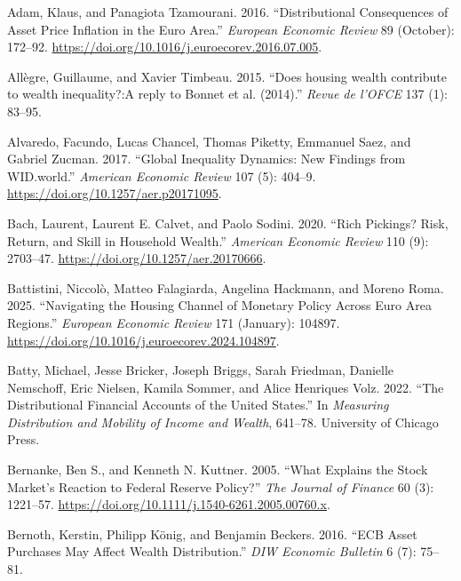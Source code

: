 \documentclass[
  a4paper,
  DIV=11,
  numbers=noendperiod]{scrartcl}
\newlength{\cslhangindent}
\newenvironment{CSLReferences}[2] %
 {\begin{list}{}{%
  \setlength{\itemindent}{0pt}
  \setlength{\leftmargin}{0pt}
  \setlength{\parsep}{0pt}
  \ifodd #1
   \setlength{\leftmargin}{\cslhangindent}
   \setlength{\itemindent}{-1\cslhangindent}
  \fi
  \setlength{\itemsep}{#2\baselineskip}}}
 {\end{list}}
\begin{document}
\label{refs}
\begin{CSLReferences}{1}{0}
Adam, Klaus, and Panagiota Tzamourani. 2016. {``Distributional
Consequences of Asset Price Inflation in the {Euro Area}.''}
\emph{European Economic Review} 89 (October): 172--92.
\url{https://doi.org/10.1016/j.euroecorev.2016.07.005}.

Allègre, Guillaume, and Xavier Timbeau. 2015. {``{Does housing wealth
contribute to wealth inequality?:A reply to Bonnet et al. (2014)}.''}
\emph{Revue de l'OFCE} 137 (1): 83--95.

Alvaredo, Facundo, Lucas Chancel, Thomas Piketty, Emmanuel Saez, and
Gabriel Zucman. 2017. {``Global {Inequality Dynamics}: {New Findings}
from {WID}.world.''} \emph{American Economic Review} 107 (5): 404--9.
\url{https://doi.org/10.1257/aer.p20171095}.

Bach, Laurent, Laurent E. Calvet, and Paolo Sodini. 2020. {``Rich
{Pickings}? {Risk}, {Return}, and {Skill} in {Household Wealth}.''}
\emph{American Economic Review} 110 (9): 2703--47.
\url{https://doi.org/10.1257/aer.20170666}.

Battistini, Niccolò, Matteo Falagiarda, Angelina Hackmann, and Moreno
Roma. 2025. {``Navigating the Housing Channel of Monetary Policy Across
Euro Area Regions.''} \emph{European Economic Review} 171 (January):
104897. \url{https://doi.org/10.1016/j.euroecorev.2024.104897}.

Batty, Michael, Jesse Bricker, Joseph Briggs, Sarah Friedman, Danielle
Nemschoff, Eric Nielsen, Kamila Sommer, and Alice Henriques Volz. 2022.
{``The {Distributional Financial Accounts} of the {United States}.''} In
\emph{Measuring {Distribution} and {Mobility} of {Income} and {Wealth}},
641--78. University of Chicago Press.

Bernanke, Ben S., and Kenneth N. Kuttner. 2005. {``What {Explains} the
{Stock Market}'s {Reaction} to {Federal Reserve Policy}?''} \emph{The
Journal of Finance} 60 (3): 1221--57.
\url{https://doi.org/10.1111/j.1540-6261.2005.00760.x}.

Bernoth, Kerstin, Philipp König, and Benjamin Beckers. 2016. {``{ECB}
Asset Purchases May Affect Wealth Distribution.''} \emph{DIW Economic
Bulletin} 6 (7): 75--81.


\end{CSLReferences}
\end{document}
